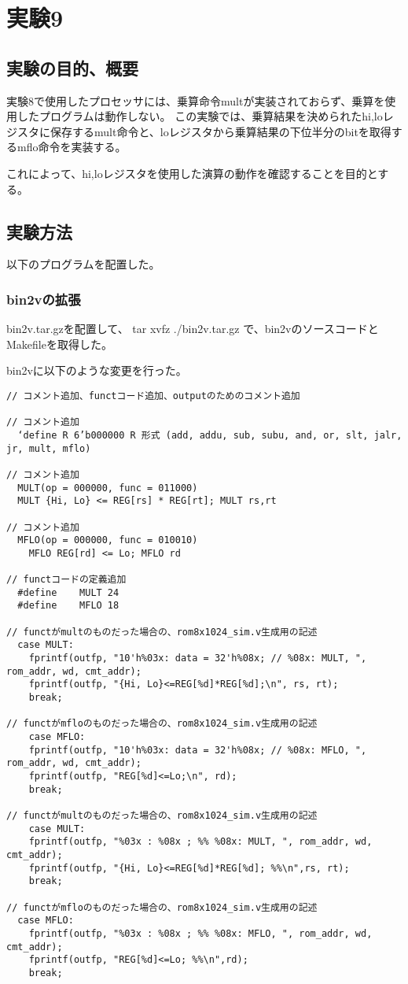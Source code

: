 \section{実験9}
\subsection{実験の目的、概要}
実験8で使用したプロセッサには、乗算命令multが実装されておらず、乗算を使用したプログラムは動作しない。
この実験では、乗算結果を決められたhi,loレジスタに保存するmult命令と、loレジスタから乗算結果の下位半分のbitを取得するmflo命令を実装する。

これによって、hi,loレジスタを使用した演算の動作を確認することを目的とする。

\subsection{実験方法}
以下のプログラムを配置した。


\subsubsection{bin2vの拡張}
bin2v.tar.gzを配置して、
tar xvfz ./bin2v.tar.gz で、bin2vのソースコードとMakefileを取得した。

bin2vに以下のような変更を行った。
\begin{lstlisting}[caption={bin2vの拡張},label={bin2vの拡張}]
// コメント追加、functコード追加、outputのためのコメント追加

// コメント追加
  ‘define R 6’b000000 R 形式 (add, addu, sub, subu, and, or, slt, jalr, jr, mult, mflo)

// コメント追加
  MULT(op = 000000, func = 011000)
  MULT {Hi, Lo} <= REG[rs] * REG[rt]; MULT rs,rt
  
// コメント追加
  MFLO(op = 000000, func = 010010)
	MFLO REG[rd] <= Lo; MFLO rd

// functコードの定義追加
  #define    MULT 24
  #define    MFLO 18

// functがmultのものだった場合の、rom8x1024_sim.v生成用の記述
  case MULT:
    fprintf(outfp, "10'h%03x: data = 32'h%08x; // %08x: MULT, ", rom_addr, wd, cmt_addr);
    fprintf(outfp, "{Hi, Lo}<=REG[%d]*REG[%d];\n", rs, rt);
    break;

// functがmfloのものだった場合の、rom8x1024_sim.v生成用の記述
    case MFLO:
    fprintf(outfp, "10'h%03x: data = 32'h%08x; // %08x: MFLO, ", rom_addr, wd, cmt_addr);
    fprintf(outfp, "REG[%d]<=Lo;\n", rd);
    break;

// functがmultのものだった場合の、rom8x1024_sim.v生成用の記述
    case MULT:
    fprintf(outfp, "%03x : %08x ; %% %08x: MULT, ", rom_addr, wd, cmt_addr);
    fprintf(outfp, "{Hi, Lo}<=REG[%d]*REG[%d]; %%\n",rs, rt);
    break;

// functがmfloのものだった場合の、rom8x1024_sim.v生成用の記述 
  case MFLO:
    fprintf(outfp, "%03x : %08x ; %% %08x: MFLO, ", rom_addr, wd, cmt_addr);
    fprintf(outfp, "REG[%d]<=Lo; %%\n",rd);
    break;
\end{lstlisting}

